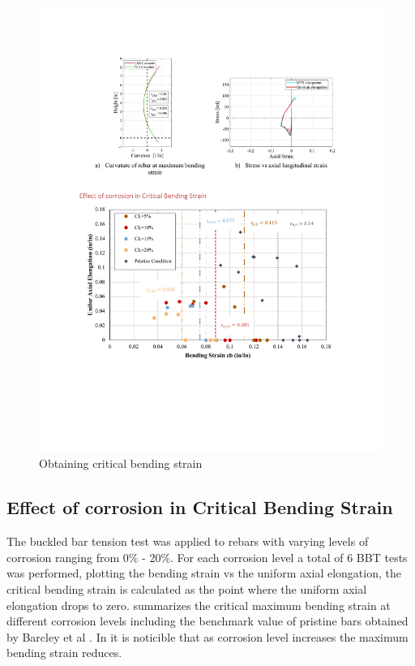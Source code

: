 \begin{figure}[htbp]
	\centering
	\includegraphics[width=1\textwidth]{VAC Thesis 2.0/Chapter-4/figs/BBT_curvature.pdf}
	\caption{Obtaining critical bending strain}
	\label{fig:bendingstrain}
\end{figure}

\subsection{Effect of corrosion in Critical Bending Strain}

The buckled bar tension test was applied to rebars with varying levels of corrosion ranging from 0\% - 20\%. For each corrosion level a total of 6 BBT tests was performed, plotting the bending strain vs the uniform axial elongation, the critical bending strain is calculated as the point where the uniform axial elongation drops to zero.  summarizes the critical maximum bending strain at different corrosion levels including the benchmark value of pristine bars obtained by Barcley et al \cite{Barcley2018}. In  it is noticible that as corrosion level increases the maximum bending strain reduces.

